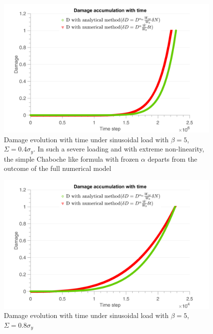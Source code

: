 \documentclass[3p,times,procedia,number]{elsarticle}
\begin{document}
\begin{figure}[!h]
	\centering
	\includegraphics[width=\textwidth]{figures//damsin_bigbeta_04y.png} 
	\caption{Damage evolution with time under sinusoidal load with $\beta=5$, $\Sigma=0.4\sigma_y$. In such a severe loading and with extreme non-linearity, the simple Chaboche like formula with frozen $\alpha$ departs from the outcome of the full numerical model}
	\label{fig.damsin_bigbeta_04y}
\end{figure}
\begin{figure}[!h]
	\centering
	\includegraphics[width=\textwidth]{figures//damsin_bigbeta_08y.png} 
	\caption{Damage evolution with time under sinusoidal load with $\beta=5$, $\Sigma=0.8\sigma_y$}
	\label{fig.damsin_bigbeta_08y}
\end{figure}

\clearpage
\end{document}
